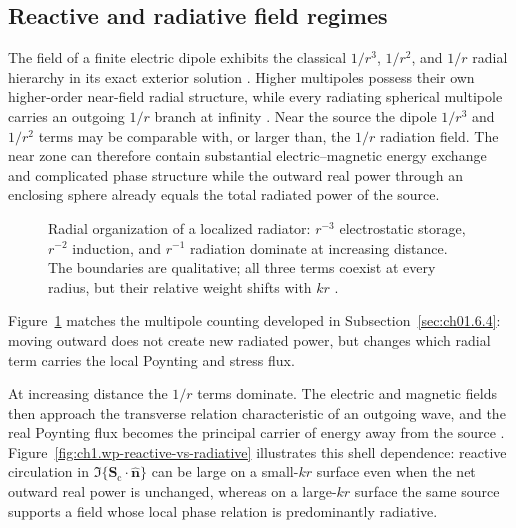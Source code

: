 \subsection{Reactive and radiative field regimes}
\label{sec:ch01.2.4}

The field of a finite electric dipole exhibits the classical $1/r^3$, $1/r^2$, and $1/r$ radial hierarchy in its exact exterior solution \cite{stratton1941}. Higher multipoles possess their own higher-order near-field radial structure, while every radiating spherical multipole carries an outgoing $1/r$ branch at infinity \cite{stratton1941,hansen1988}. Near the source the dipole $1/r^3$ and $1/r^2$ terms may be comparable with, or larger than, the $1/r$ radiation field. The near zone can therefore contain substantial electric--magnetic energy exchange and complicated phase structure while the outward real power through an enclosing sphere already equals the total radiated power of the source.

\begin{figure}[t]
\centering
\VolIPhysFig{\VolIPhysRadialFieldZones}
\caption{Radial organization of a localized radiator: $r^{-3}$ electrostatic storage, $r^{-2}$ induction, and $r^{-1}$ radiation dominate at increasing distance. The boundaries are qualitative; all three terms coexist at every radius, but their relative weight shifts with $kr$ \cite{stratton1941,poynting1884}.}
\label{fig:ch1.radial-field-zones}
\end{figure}

Figure~\ref{fig:ch1.radial-field-zones} matches the multipole counting developed in Subsection~\ref{sec:ch01.6.4}: moving outward does not create new radiated power, but changes which radial term carries the local Poynting and stress flux.

At increasing distance the $1/r$ terms dominate. The electric and magnetic fields then approach the transverse relation characteristic of an outgoing wave, and the real Poynting flux becomes the principal carrier of energy away from the source \cite{poynting1884}. Figure~\ref{fig:ch1.wp-reactive-vs-radiative} illustrates this shell dependence: reactive circulation in $\Im\{\mathbf{S}_\mathrm{c}\cdot\hat{\mathbf{n}}\}$ can be large on a small-$kr$ surface even when the net outward real power is unchanged, whereas on a large-$kr$ surface the same source supports a field whose local phase relation is predominantly radiative.


